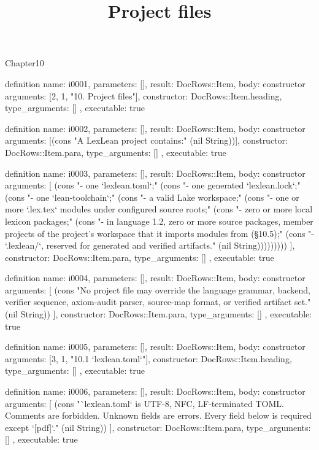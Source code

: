 \begin{lexlean}{Chapter10}
\title{Project files}
\begin{semanticmodule}
definition{
  name: i0001,
  parameters: [],
  result: DocRows::Item,
  body: constructor{
    arguments: [2, 1, "10. Project files"],
    constructor: DocRows::Item.heading,
    type_arguments: []
  },
  executable: true
}

definition{
  name: i0002,
  parameters: [],
  result: DocRows::Item,
  body: constructor{
    arguments: [(cons "A LexLean project contains:" (nil String))],
    constructor: DocRows::Item.para,
    type_arguments: []
  },
  executable: true
}

definition{
  name: i0003,
  parameters: [],
  result: DocRows::Item,
  body: constructor{
    arguments: [
      (cons "- one `lexlean.toml`;" (cons "- one generated `lexlean.lock`;" (cons "- one `lean-toolchain`;" (cons "- a valid Lake workspace;" (cons "- one or more `.lex.tex` modules under configured source roots;" (cons "- zero or more local lexicon packages;" (cons "- in language 1.2, zero or more source packages, member projects of the project's workspace that it imports modules from (§10.5);" (cons "- `.lexlean/`, reserved for generated and verified artifacts." (nil String)))))))))
    ],
    constructor: DocRows::Item.para,
    type_arguments: []
  },
  executable: true
}

definition{
  name: i0004,
  parameters: [],
  result: DocRows::Item,
  body: constructor{
    arguments: [
      (cons "No project file may override the language grammar, backend, verifier sequence, axiom-audit parser, source-map format, or verified artifact set." (nil String))
    ],
    constructor: DocRows::Item.para,
    type_arguments: []
  },
  executable: true
}

definition{
  name: i0005,
  parameters: [],
  result: DocRows::Item,
  body: constructor{
    arguments: [3, 1, "10.1 `lexlean.toml`"],
    constructor: DocRows::Item.heading,
    type_arguments: []
  },
  executable: true
}

definition{
  name: i0006,
  parameters: [],
  result: DocRows::Item,
  body: constructor{
    arguments: [
      (cons "`lexlean.toml` is UTF-8, NFC, LF-terminated TOML. Comments are forbidden. Unknown fields are errors. Every field below is required except `[pdf]`." (nil String))
    ],
    constructor: DocRows::Item.para,
    type_arguments: []
  },
  executable: true
}


\end{semanticmodule}
\end{lexlean}
